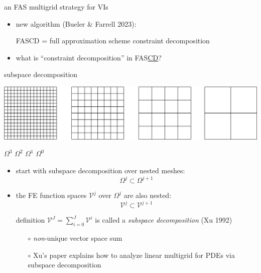 \documentclass[svgnames,
               hyperref={colorlinks,citecolor=DeepPink4,linkcolor=FireBrick,urlcolor=Maroon},
               usepdftitle=false]  %
               {beamer}
\newcommand{\ds}{\displaystyle}
\begin{document}
\begin{frame}{an FAS multigrid strategy for VIs}

\begin{itemize}
\item new algorithm (Bueler \& Farrell 2023):

{\color{FireBrick} FASCD = full approximation scheme constraint decomposition}

\bigskip
\item what is ``constraint decomposition'' in FAS\underline{CD}?
\end{itemize}
\end{frame}

\newcommand{\cK}{\mathcal{K}}

\begin{frame}{subspace decomposition}

\hfill \includegraphics[height=0.12\textheight]{../talk-oxford/images/mg-grids.png}

{\footnotesize
\hfill $\Omega^3$ \hspace{8.5mm} $\Omega^2$ \hspace{8.5mm} $\Omega^1$ \hspace{8.5mm} $\Omega^0$ \hspace{1mm}
}

\begin{itemize}
\item start with subspace decomposition over nested meshes:
    $$\Omega^j \subset \Omega^{j+1}$$
\item the FE function spaces $\mathcal{V}^j$ over $\Omega^j$ are also nested:
    $$\mathcal{V}^j \subset \mathcal{V}^{j+1}$$

\begin{block}{definition}
$\ds \mathcal{V}^J = \sum_{i=0}^J \mathcal{V}^i$ \quad is called a \emph{subspace decomposition} (Xu 1992)
\end{block}
    \begin{itemize}
    \item[$\circ$] \emph{non}-unique vector space sum
    \item[$\circ$] Xu's paper explains how to analyze linear multigrid for PDEs via subspace decomposition
    \end{itemize}
\end{itemize}
\end{frame}
\end{document}
